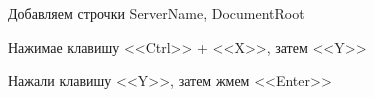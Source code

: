 \begin{figure}[p]
    \caption{Добавляем строчки ServerName, DocumentRoot}
    \label{fig:sudo-nano-mysite-conf-step-2}
\end{figure}

\begin{figure}[p]
    \caption{Нажимае клавишу <<Ctrl>> + <<X>>, затем <<Y>>}
    \label{fig:sudo-nano-mysite-conf-step-3}
\end{figure}

\begin{figure}[p]
    \caption{Нажали клавишу <<Y>>, затем жмем <<Enter>>}
    \label{fig:sudo-nano-mysite-conf-step-4}
\end{figure}

